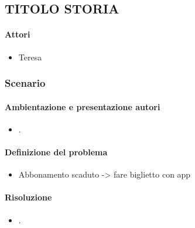 \documentclass[../../UUX_Personas.tex]{subfiles}
\begin{document}
	\subsection{TITOLO STORIA}
	\paragraph{Attori}
	\begin{itemize}
		\item Teresa
	\end{itemize}

	\subsubsection{Scenario} 
	\paragraph{Ambientazione e presentazione autori}
	\begin{itemize}
		\item .
	\end{itemize}
	\paragraph{Definizione del problema}
	\begin{itemize}
		\item Abbonamento scaduto -> fare biglietto con app
	\end{itemize}
	\paragraph{Risoluzione}
	\begin{itemize}
		\item .
	\end{itemize}
\end{document}
